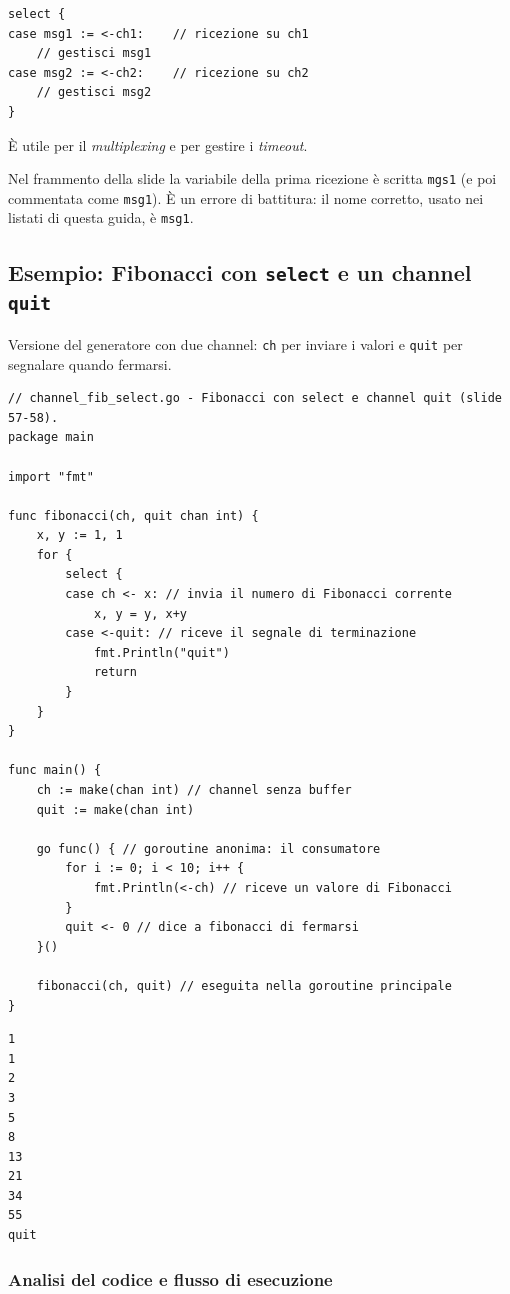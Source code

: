 \documentclass[11pt,a4paper]{report}
\newcommand{\cod}[1]{\texttt{#1}}
\begin{document}
\begin{lstlisting}[style=gocode,numbers=none]
select {
case msg1 := <-ch1:    // ricezione su ch1
	// gestisci msg1
case msg2 := <-ch2:    // ricezione su ch2
	// gestisci msg2
}
\end{lstlisting}

È utile per il \emph{multiplexing} e per gestire i \emph{timeout}.

\begin{nota}
Nel frammento della slide la variabile della prima ricezione è scritta
\cod{mgs1} (e poi commentata come \cod{msg1}). È un errore di battitura:
il nome corretto, usato nei listati di questa guida, è \cod{msg1}.
\end{nota}

\subsection{Esempio: Fibonacci con \texttt{select} e un channel \texttt{quit}}

Versione del generatore con due channel: \cod{ch} per inviare i valori e
\cod{quit} per segnalare quando fermarsi.

\begin{lstlisting}[style=gocode,caption={\texttt{06\_concurrency/channel\_fib\_select.go}}]
// channel_fib_select.go - Fibonacci con select e channel quit (slide 57-58).
package main

import "fmt"

func fibonacci(ch, quit chan int) {
	x, y := 1, 1
	for {
		select {
		case ch <- x: // invia il numero di Fibonacci corrente
			x, y = y, x+y
		case <-quit: // riceve il segnale di terminazione
			fmt.Println("quit")
			return
		}
	}
}

func main() {
	ch := make(chan int) // channel senza buffer
	quit := make(chan int)

	go func() { // goroutine anonima: il consumatore
		for i := 0; i < 10; i++ {
			fmt.Println(<-ch) // riceve un valore di Fibonacci
		}
		quit <- 0 // dice a fibonacci di fermarsi
	}()

	fibonacci(ch, quit) // eseguita nella goroutine principale
}
\end{lstlisting}
\begin{lstlisting}[style=output]
1
1
2
3
5
8
13
21
34
55
quit
\end{lstlisting}

\subsubsection*{Analisi del codice e flusso di esecuzione}
\end{document}

